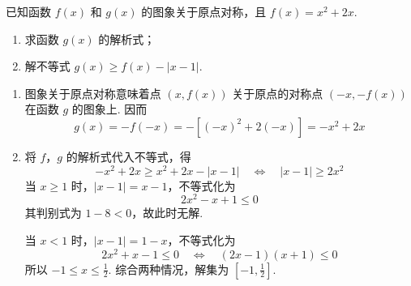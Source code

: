 \begin{problem}
已知函数 \( f(x) \) 和 \( g(x) \) 的图象关于原点对称，且 \( f(x) = x^{2} + 2x \).
\begin{enumerate}
\item 求函数 \( g(x) \) 的解析式；
\item 解不等式 \( g(x) \geqslant f(x) - |x - 1| \).
\end{enumerate}

\begin{solution}
\begin{enumerate}
\item 图象关于原点对称意味着点 \((x,f(x))\) 关于原点的对称点 \((-x,-f(x))\) 在函数 \(g\) 的图象上. 因而
\[
g(x)=-f(-x)=-\left[(-x)^2+2(-x)\right]=-x^2+2x
\]

\item 将 \(f\)，\(g\) 的解析式代入不等式，得
\[
-x^2+2x\geqslant x^2+2x-|x-1|
\quad\Longleftrightarrow\quad
|x-1|\geqslant2x^2
\]
当 \(x\geqslant1\) 时，\(|x-1|=x-1\)，不等式化为
\[
2x^2-x+1\leqslant0
\]
其判别式为 \(1-8<0\)，故此时无解.

当 \(x<1\) 时，\(|x-1|=1-x\)，不等式化为
\[
2x^2+x-1\leqslant0
\quad\Longleftrightarrow\quad
(2x-1)(x+1)\leqslant0
\]
所以 \(-1\leqslant x\leqslant\frac12\). 综合两种情况，解集为
\(\left[-1,\frac12\right]\).
\end{enumerate}
\end{solution}
\end{problem}

